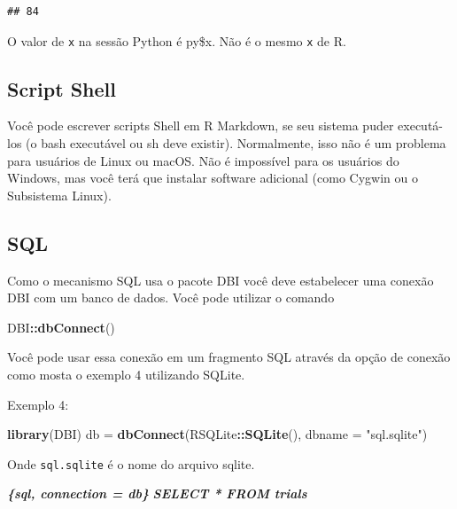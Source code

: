 \documentclass[
]{book}
\newenvironment{Shaded}{\begin{snugshade}}{\end{snugshade}}
\newcommand{\DataTypeTok}[1]{\textcolor[rgb]{0.13,0.29,0.53}{#1}}
\newcommand{\InformationTok}[1]{\textcolor[rgb]{0.56,0.35,0.01}{\textbf{\textit{#1}}}}
\newcommand{\KeywordTok}[1]{\textcolor[rgb]{0.13,0.29,0.53}{\textbf{#1}}}
\newcommand{\NormalTok}[1]{#1}
\newcommand{\OperatorTok}[1]{\textcolor[rgb]{0.81,0.36,0.00}{\textbf{#1}}}
\newcommand{\StringTok}[1]{\textcolor[rgb]{0.31,0.60,0.02}{#1}}
\begin{document}
\begin{verbatim}
## 84
\end{verbatim}

O valor de \texttt{x} na sessão Python é py\$x. Não é o mesmo \texttt{x} de R.

\hypertarget{script-shell}{%
\subsection{Script Shell}\label{script-shell}}

Você pode escrever scripts Shell em R Markdown, se seu sistema puder executá-los (o bash executável ou sh deve existir). Normalmente, isso não é um problema para usuários de Linux ou macOS. Não é impossível para os usuários do Windows, mas você terá que instalar software adicional (como Cygwin ou o Subsistema Linux).

\hypertarget{sql}{%
\subsection{SQL}\label{sql}}

Como o mecanismo SQL usa o pacote DBI você deve estabelecer uma conexão DBI com um banco de dados. Você pode utilizar o comando

\begin{Shaded}
\begin{Highlighting}[]
\NormalTok{DBI}\OperatorTok{::}\KeywordTok{dbConnect}\NormalTok{()}
\end{Highlighting}
\end{Shaded}

Você pode usar essa conexão em um fragmento SQL através da opção de conexão como mosta o exemplo 4 utilizando SQLite.

Exemplo 4:

\begin{Shaded}
\begin{Highlighting}[]
\KeywordTok{library}\NormalTok{(DBI)}
\NormalTok{db =}\StringTok{ }\KeywordTok{dbConnect}\NormalTok{(RSQLite}\OperatorTok{::}\KeywordTok{SQLite}\NormalTok{(), }\DataTypeTok{dbname =} \StringTok{"sql.sqlite"}\NormalTok{)}
\end{Highlighting}
\end{Shaded}

Onde \texttt{sql.sqlite} é o nome do arquivo sqlite.

\begin{Shaded}
\begin{Highlighting}[]
 \InformationTok{\textasciigrave{}\textasciigrave{}\textasciigrave{}\{sql, connection = db\}}
\InformationTok{SELECT * FROM trials}
\InformationTok{\textasciigrave{}\textasciigrave{}\textasciigrave{}}
\end{Highlighting}
\end{Shaded}
\end{document}
